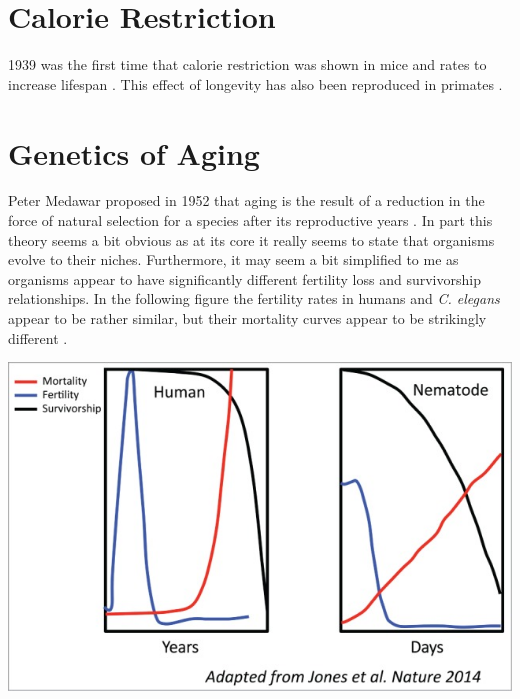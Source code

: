 \documentclass[]{book}
\newenvironment{Shaded}{\begin{snugshade}}{\end{snugshade}}
\newcommand{\KeywordTok}[1]{\textcolor[rgb]{0.13,0.29,0.53}{\textbf{#1}}}
\newcommand{\DataTypeTok}[1]{\textcolor[rgb]{0.13,0.29,0.53}{#1}}
\newcommand{\DecValTok}[1]{\textcolor[rgb]{0.00,0.00,0.81}{#1}}
\newcommand{\StringTok}[1]{\textcolor[rgb]{0.31,0.60,0.02}{#1}}
\newcommand{\OtherTok}[1]{\textcolor[rgb]{0.56,0.35,0.01}{#1}}
\newcommand{\OperatorTok}[1]{\textcolor[rgb]{0.81,0.36,0.00}{\textbf{#1}}}
\newcommand{\NormalTok}[1]{#1}
\begin{document}
\section{Calorie Restriction}\label{calorie-restriction}

1939 was the first time that calorie restriction was shown in mice and
rates to increase lifespan \citep{mccay1935effect}. This effect of
longevity has also been reproduced in primates
\citep{pifferi2018caloric, mattison2017caloric}.

\section{Genetics of Aging}\label{genetics-of-aging}

Peter Medawar proposed in 1952 that aging is the result of a reduction
in the force of natural selection for a species after its reproductive
years \citep{medawar1952unsolved}. In part this theory seems a bit
obvious as at its core it really seems to state that organisms evolve to
their niches. Furthermore, it may seem a bit simplified to me as
organisms appear to have significantly different fertility loss and
survivorship relationships. In the following figure the fertility rates
in humans and \emph{C. elegans} appear to be rather similar, but their
mortality curves appear to be strikingly different
\citep{aguilaniu2015mysterious}.

\begin{Shaded}
\end{Shaded}

\includegraphics{images/04-6.jpg}
\end{document}
